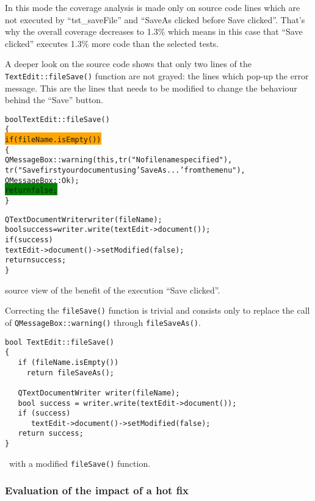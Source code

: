 In this mode the coverage analysis is made only on source code lines which are
not executed by ``\textsf{tst\_saveFile}'' and ``\textsf{SaveAs clicked before Save clicked}''.
That's why the overall coverage decreases to 1.3\% which means in this case
that ``\textsf{Save clicked}'' executes 1.3\% more code than the selected tests. 

A deeper look on the source code shows that  only two lines of the
\verb$TextEdit::fileSave()$ function  are not grayed:
the lines which pop-up the error message. This are the lines that needs to be
modified to change the behaviour behind the ``\textsf{Save}'' button.

\begin{figureenv}
  \scriptsize
\begin{alltt}
bool TextEdit::fileSave()
\{
\colorbox{orange}{  if (fileName.isEmpty())}
  \{
    QMessageBox::warning(this,tr("No file name specified"),
      tr("Save first your document using 'Save As...' from the menu"),
      QMessageBox::Ok );
\colorbox{green}{    return false;}
   \}

  QTextDocumentWriter writer(fileName);
  bool success = writer.write(textEdit->document());
\colorbox{Graylight}{  if (success)}
\colorbox{Graylight}{     textEdit->document()->setModified(false);}
\colorbox{Graylight}{  return success;}
\}
\end{alltt}
\caption{{\CoverageBrowser} source view of the benefit of the execution ``Save clicked''.}
\label{lst:src10}
\end{figureenv}

Correcting the \verb$fileSave()$ function is trivial and consists only to
replace the call of \verb$QMessageBox::warning()$ through \verb$fileSaveAs()$.

\begin{figureenv}
  \scriptsize
\begin{verbatim}
bool TextEdit::fileSave()
{
   if (fileName.isEmpty())
     return fileSaveAs();

   QTextDocumentWriter writer(fileName);
   bool success = writer.write(textEdit->document());
   if (success)
      textEdit->document()->setModified(false);
   return success;
}
\end{verbatim}
\caption{\TextEdit\ with a modified \texttt{fileSave()} function.}
\label{lst:src11}
\end{figureenv}

\subsubsection{\label{sec:patchimpact}Evaluation of the impact of a hot fix}

